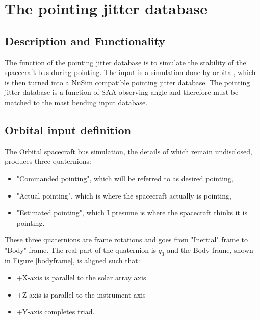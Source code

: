 %

\section{The pointing jitter database}

\subsection{Description and Functionality}
The function of the pointing jitter database is to simulate the stability of the spacecraft bus during pointing. The input is a simulation done by orbital, which is then turned into a NuSim compatible pointing jitter database. The pointing jitter database is a function of SAA observing angle and therefore must be matched to the mast bending input database.

\subsection{Orbital input definition}
The Orbital spacecraft bus simulation, the details of which remain undisclosed, produces three quaternions: 
\begin{itemize}
\item "Commanded pointing", which will be referred to as desired pointing, 
\item "Actual pointing", which is where the spacecraft actually is pointing,
\item "Estimated pointing", which I presume is where the spacecraft thinks it is pointing.
\end{itemize}
These three quaternions are frame rotations and goes from "Inertial" frame to "Body" frame. The real part of the quaternion is $q_3$ and the Body frame, shown in Figure \ref{bodyframe}, is aligned such that:
 \begin{itemize}
 \item +X-axis is parallel to the solar array axis
 \item +Z-axis is parallel to the instrument axis
 \item +Y-axis completes triad.
\end{itemize}
 
